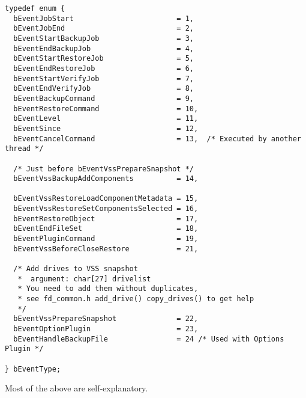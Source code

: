 \begin{verbatim}
typedef enum {
  bEventJobStart                        = 1,
  bEventJobEnd                          = 2,
  bEventStartBackupJob                  = 3,
  bEventEndBackupJob                    = 4,
  bEventStartRestoreJob                 = 5,
  bEventEndRestoreJob                   = 6,
  bEventStartVerifyJob                  = 7,
  bEventEndVerifyJob                    = 8,
  bEventBackupCommand                   = 9,
  bEventRestoreCommand                  = 10,
  bEventLevel                           = 11,
  bEventSince                           = 12,
  bEventCancelCommand                   = 13,  /* Executed by another thread */

  /* Just before bEventVssPrepareSnapshot */
  bEventVssBackupAddComponents          = 14,

  bEventVssRestoreLoadComponentMetadata = 15,
  bEventVssRestoreSetComponentsSelected = 16,
  bEventRestoreObject                   = 17,
  bEventEndFileSet                      = 18,
  bEventPluginCommand                   = 19,
  bEventVssBeforeCloseRestore           = 21,

  /* Add drives to VSS snapshot
   *  argument: char[27] drivelist
   * You need to add them without duplicates,
   * see fd_common.h add_drive() copy_drives() to get help
   */
  bEventVssPrepareSnapshot              = 22,
  bEventOptionPlugin                    = 23,
  bEventHandleBackupFile                = 24 /* Used with Options Plugin */

} bEventType;

\end{verbatim}

Most of the above are self-explanatory.

